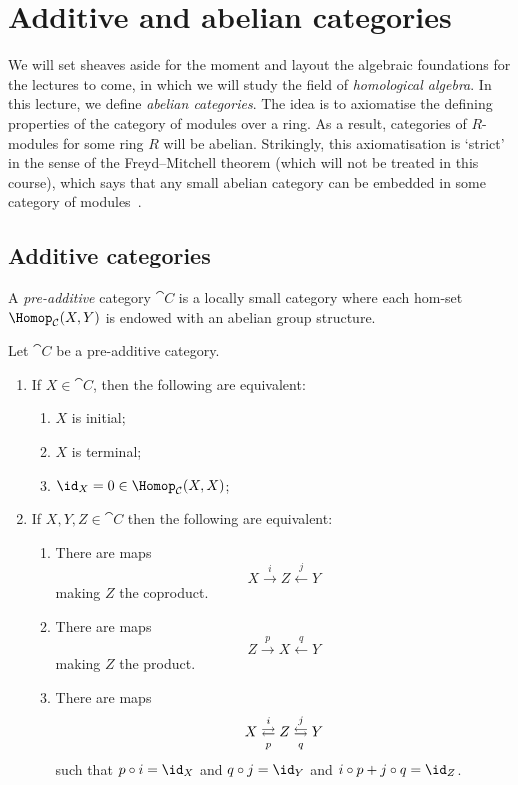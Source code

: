 \documentclass[../main.tex]{subfiles}
\begin{document}
\chapter{Additive and abelian categories}
We will set sheaves aside for the moment and layout the algebraic foundations for the lectures to come, in which we will study the field of \emph{homological algebra}.
In this lecture, we define \emph{abelian categories}.
The idea is to axiomatise the defining properties of the category of modules over a ring.
As a result, categories of \(R\)-modules for some ring \(R\) will be abelian.
Strikingly, this axiomatisation is `strict' in the sense of the Freyd--Mitchell theorem (which will not be treated in this course), which says that any small abelian category can be embedded in some category of modules~\cite[Theorem~1.6.1]{WeibelHomologicalAlgebra}. 

\section{Additive categories}
\begin{defn}
  A \emph{pre-additive} category $\cat C$ is a locally small category where each hom-set $\Hom_{\cat C}(X, Y)$ is endowed with an abelian group structure.
\end{defn}
\begin{lem}\label{lem:pre-additive-categories-are-nice}
Let $\cat C$ be a pre-additive category.
\begin{enumerate}
  \item If $X \in \cat C$, then the following are equivalent:
  \begin{enumerate}
    \item\label{lem:pre-additive-categories-are-nice:initial} $X$ is initial;
    \item\label{lem:pre-additive-categories-are-nice:terminal} $X$ is terminal;
    \item\label{lem:pre-additive-categories-are-nice:identity-zero} $\id_X = 0 \in \Hom_{\cat C}(X,X)$;
  \end{enumerate}
  \item If $X, Y, Z \in \cat C$ then the following are equivalent:
  \begin{enumerate}
    \item\label{lem:pre-additive-categories-are-nice:coproduct} There are maps \[X \xrightarrow{i} Z \xleftarrow{j} Y\] making $Z$ the coproduct.
    \item\label{lem:pre-additive-categories-are-nice:product} There are maps \[Z \xrightarrow{p} X \xleftarrow{q} Y\] making $Z$ the product.
    \item\label{lem:pre-additive-categories-are-nice:biproduct} There are maps \[X \xrightleftarrows{i}[p] Z \xleftrightarrows{j}[q] Y\] such that $p \circ i = \id_X$ and $q \circ j = \id_Y$ and $i\circ p + j \circ q = \id_Z$.
  \end{enumerate}
\end{enumerate}
\end{lem}
\end{document}
